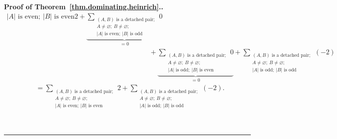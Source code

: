 \documentclass[numbers=enddot,12pt,final,onecolumn,notitlepage]{scrartcl}%
\theoremstyle{definition}
\newenvironment{proof}[1][Proof]{\noindent\textbf{#1.} }{\ \rule{0.5em}{0.5em}}
\let\sumnonlimits\sum
\renewcommand{\sum}{\sumnonlimits\limits}
\newcommand{\abs}[1]{\left| #1 \right|}
\newcommand{\tup}[1]{\left( #1 \right)}
\begin{document}
\begin{proof}[Proof of Theorem~\ref{thm.dominating.heinrich}.]
\begin{align*}
{{                \abs{A} \text{ is even};
                \ \abs{B} \text{ is even}}}
   2
+ \underbrace{\sum_{\substack{\tup{A, B} \text{ is a detached pair}; \\
                A \neq \varnothing; \  B \neq \varnothing ; \\
                \abs{A} \text{ is even};
                \ \abs{B} \text{ is odd}}}
   0}_{= 0} \\
&\qquad + \underbrace{
   \sum_{\substack{\tup{A, B} \text{ is a detached pair}; \\
                A \neq \varnothing; \  B \neq \varnothing ; \\
                \abs{A} \text{ is odd};
                \ \abs{B} \text{ is even}}}
   0}_{= 0}
+ \sum_{\substack{\tup{A, B} \text{ is a detached pair}; \\
                A \neq \varnothing; \  B \neq \varnothing ; \\
                \abs{A} \text{ is odd};
                \ \abs{B} \text{ is odd}}}
   \tup{-2}
\end{align*}
\begin{align}
&= \sum_{\substack{\tup{A, B} \text{ is a detached pair}; \\
                A \neq \varnothing; \  B \neq \varnothing ; \\
                \abs{A} \text{ is even};
                \ \abs{B} \text{ is even}}}
   2
+ \sum_{\substack{\tup{A, B} \text{ is a detached pair}; \\
                A \neq \varnothing; \  B \neq \varnothing ; \\
                \abs{A} \text{ is odd};
                \ \abs{B} \text{ is odd}}}
   \tup{-2} .
\label{pf.thm.dominating.heinrich.3}
\end{align}


\end{proof}
\end{document}
